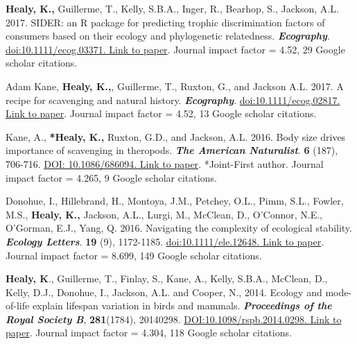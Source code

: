 \documentclass[10pt,a4paper]{article}
\begin{document}
\begin{flushleft}
\bigskip

\setlength{\parindent}{0mm}\textbf{Healy, K.,} Guillerme, T., Kelly, S.B.A., Inger, R., Bearhop, S., Jackson, A.L. 2017. SIDER: an R package for predicting trophic discrimination factors of consumers based on their ecology and phylogenetic relatedness. \textit{\textbf{Ecography}}. \href{https://onlinelibrary.wiley.com/doi/abs/10.1111/ecog.03371}{doi:10.1111/ecog.03371. Link to paper}. Journal impact factor = 4.52, 29 Google scholar citations.
\bigskip

\setlength{\parindent}{0mm} Adam Kane, \textbf{Healy, K.,}, Guillerme, T., Ruxton, G., and Jackson A.L. 2017. A recipe for scavenging and natural history. \textit{\textbf{Ecography}}. \href{https://onlinelibrary.wiley.com/doi/pdf/10.1111/ecog.02817}{doi:10.1111/ecog.02817. Link to paper}. Journal impact factor = 4.52, 13 Google scholar citations.
\bigskip


\setlength{\parindent}{0mm}Kane, A., \textbf{*Healy, K.,} Ruxton, G.D., and Jackson, A.L. 2016. Body size drives importance of scavenging in theropods. \textit{\textbf{The American Naturalist}}. \textbf{6} (187), 706-716. \href{https://www.researchgate.net/profile/Kevin_Healy/publication/301279301_Body_Size_as_a_Driver_of_Scavenging_in_Theropod_Dinosaurs/links/570f8b2a08ae38897ba19c35.pdf.}{DOI: 10.1086/686094. Link to paper}. *Joint-First author. Journal impact factor = 4.265, 9 Google scholar citations.

\bigskip

\setlength{\parindent}{0mm}Donohue, I., Hillebrand, H., Montoya, J.M., Petchey, O.L., Pimm, S.L., Fowler, M.S., \textbf{Healy, K.,} Jackson, A.L., Lurgi, M., McClean, D., O'Connor, N.E., O'Gorman, E.J., Yang, Q. 2016. Navigating the complexity of ecological stability. \textit{\textbf{Ecology Letters}}. \textbf{19} (9), 1172-1185. \href{https://onlinelibrary.wiley.com/doi/abs/10.1111/ele.12648}{doi:10.1111/ele.12648. Link to paper}. Journal impact factor = 8.699, 149 Google scholar citations.

\bigskip

\textbf{Healy, K}., Guillerme, T., Finlay, S., Kane, A., Kelly, S.B.A., McClean, D., Kelly, D.J., Donohue, I., Jackson, A.L. and Cooper, N., 2014. Ecology and mode-of-life explain lifespan variation in birds and mammals. \textit{\textbf{Proceedings of the Royal Society B}}, \textbf{281}(1784), 20140298. \href{http://rspb.royalsocietypublishing.org/content/281/1784/20140298}{DOI:10.1098/rspb.2014.0298. Link to paper}. Journal impact factor = 4.304, 118 Google scholar citations.


\end{flushleft}
\end{document}
